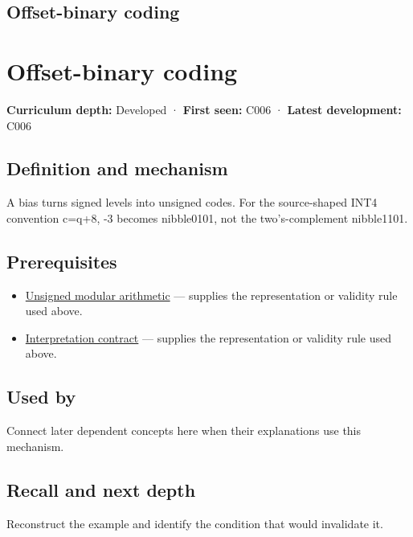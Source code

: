 \hypertarget{appendix-53a8cfb25f8d}{}
\section*{Offset-binary coding}
\chapter{Offset-binary coding}\label{appendix-53a8cfb25f8d-offset-binary-coding}

\textbf{Curriculum depth:} Developed · \textbf{First seen:} C006 · \textbf{Latest development:} C006

\section{Definition and mechanism}\label{appendix-53a8cfb25f8d-definition-and-mechanism}

A bias turns signed levels into unsigned codes. For the source-shaped INT4 convention c=q+8, -3 becomes nibble0101, not the two's-complement nibble1101.

\section{Prerequisites}\label{appendix-53a8cfb25f8d-prerequisites}

\begin{itemize}
\tightlist
\item
  \hyperref[appendix-c99977d88b33]{Unsigned modular arithmetic} --- supplies the representation or validity rule used above.
\item
  \hyperref[appendix-f414bd4ed05c]{Interpretation contract} --- supplies the representation or validity rule used above.
\end{itemize}

\section{Used by}\label{appendix-53a8cfb25f8d-used-by}

Connect later dependent concepts here when their explanations use this mechanism.

\section{Recall and next depth}\label{appendix-53a8cfb25f8d-recall-and-next-depth}

Reconstruct the example and identify the condition that would invalidate it.

